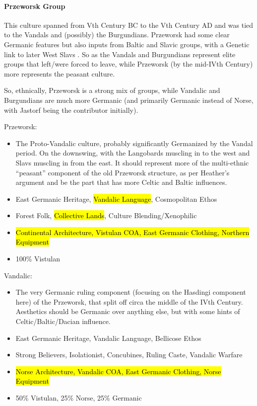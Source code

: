 \documentclass{article}
\begin{document}
	\paragraph{Przeworsk Group}
	This culture spanned from Vth Century BC to the Vth Century AD and was tied to the Vandals and (possibly) the Burgundians.
	Przeworsk had some clear Germanic features but also inputs from Baltic and Slavic groups, with a Genetic link to later West Slavs \cite{SlavGenomes}.
	So as the Vandals and Burgundians represent elite groups that left/were forced to leave, while Przeworsk (by the mid-IVth Century) more represents the peasant culture.
	
	So, ethnically, Przeworsk is a strong mix of groups, while Vandalic and Burgundians are much more Germanic (and primarily Germanic instead of Norse, with Jastorf being the contributor initially).
	
	Przeworsk:
	\begin{itemize}
		\item The Proto-Vandalic culture, probably significantly Germanized by the Vandal period. On the downswing, with the Langobards muscling in to the west and Slavs muscling in from the east.
		It should represent more of the multi-ethnic “peasant” component of the old Przeworsk structure, as per Heather’s argument and be the part that has more Celtic and Baltic influences.
		\item East Germanic Heritage, \hl{Vandalic Language}, Cosmopolitan Ethos
		\item Forest Folk, \hl{Collective Lands}, Culture Blending/Xenophilic
		\item \hl{Continental Architecture, Vistulan COA, East Germanic Clothing, Northern Equipment}
		\item 100\% Vistulan
	\end{itemize}
	
	Vandalic:
	\begin{itemize}
		\item The very Germanic ruling component (focusing on the Hasdingi component here) of the Przeworsk, that split off circa the middle of the IVth Century.
		Aesthetics should be Germanic over anything else, but with some hints of Celtic/Baltic/Dacian influence.
		\item East Germanic Heritage, Vandalic Language, Bellicose Ethos
		\item Strong Believers, Isolationist, Concubines, Ruling Caste, Vandalic Warfare
		\item \hl{Norse Architecture, Vandalic COA, East Germanic Clothing, Norse Equipment}
		\item 50\% Vistulan, 25\% Norse, 25\% Germanic
	\end{itemize}
	
\end{document}
